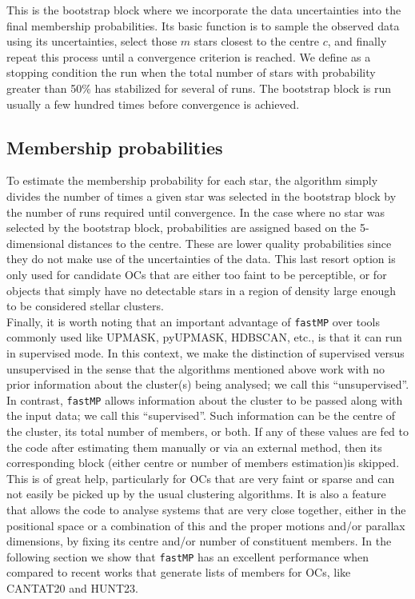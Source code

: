 \documentclass[fleqn,usenatbib]{mnras}
\begin{document}
This is the bootstrap block where we incorporate the data uncertainties into
the final membership probabilities.
Its basic function is to sample the observed data using its uncertainties,
select those $m$ stars closest to the centre $c$, and
finally repeat this process until a convergence criterion is reached. We define
as a stopping condition the run when the total number of stars with probability
greater than 50\% has stabilized for several of runs.
The bootstrap block is run usually a few hundred times before convergence is
achieved.


\subsection{Membership probabilities}

To estimate the membership probability for each star, the algorithm simply
divides the number of times a given star was selected in the bootstrap block by
the number of runs required until convergence.
In the case where no star was selected by the bootstrap block, probabilities are
assigned based on the 5-dimensional distances to the centre. These are lower
quality probabilities since they do not make use of the uncertainties of the
data. This last resort option is only used for candidate OCs that are either too
faint to be perceptible, or for objects that simply have no detectable stars in a
region of density large enough to be considered stellar clusters.\\


Finally, it is worth noting that an important advantage of \texttt{fastMP} over
tools commonly used like UPMASK, pyUPMASK, HDBSCAN, etc., is that it can run in
supervised mode. In this context, we make the distinction of supervised versus
unsupervised in the sense that the algorithms mentioned above work with no prior
information about the cluster(s) being analysed; we call this ``unsupervised''.
In contrast, \texttt{fastMP} allows information about the cluster to be passed
along with the input data; we call this ``supervised''. Such information can be
the centre of the cluster, its total number of members, or both. If any of these
values are fed to the code after estimating them manually or via an external
method, then its corresponding block (either centre or number of members
estimation)is skipped. This is of great help, particularly
for OCs that are very faint or sparse and can not easily be picked up by the
usual clustering algorithms. It is also a feature that allows the code to
analyse systems that are very close together, either in the positional space
or a combination of this and the proper motions and/or parallax dimensions,
by fixing its centre and/or number of constituent members. In the following
section we show that \texttt{fastMP} has an excellent performance  when compared
to recent works that generate lists of members for OCs, like CANTAT20 and
HUNT23.
\end{document}
